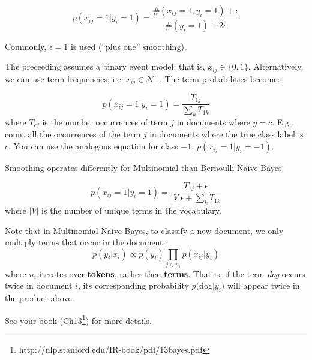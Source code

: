 \documentclass{article}
\begin{document}
$$
p(x_{ij}=1 | y_i = 1) = \frac{\#(x_{ij}=1, y_i=1) + \epsilon}{\# (y_i=1) + 2 \epsilon }
$$

Commonly, $\epsilon=1$ is used (``plus one'' smoothing).

\vspace{.1in}


The preceeding assumes a binary event model; that is, $x_{ij} \in \{0,1\}$. Alternatively, we can use term frequencies; i.e. $x_{ij} \in \mathcal{N}_+$. The term probabilities become:

$$
p(x_{ij}=1 | y_i = 1) = \frac{T_{1j}}{\sum_k T_{1k}}
$$
where $T_{cj}$ is the number occurrences of term $j$ in documents where $y=c$. E.g., count all the occurrences of the term $j$ in documents where the true class label is $c$. You can use the analogous equation for class $-1$, $p(x_{ij}=1 | y_i=-1)$.

Smoothing operates differently for Multinomial than Bernoulli Naive Bayes:

$$
p(x_{ij}=1 | y_i = 1) = \frac{T_{1j} + \epsilon}{|V|\epsilon + \sum_k T_{1k}}
$$
where $|V|$ is the number of unique terms in the vocabulary.

Note that in Multinomial Naive Bayes, to classify a new document, we only
multiply terms that occur in the document:
$$p(y_i|x_i) \propto p(y_i) \prod_{j \in n_i} p(x_{ij}|y_i)$$
where $n_i$ iterates over {\bf tokens}, rather then {\bf terms}. That is, if the term {\it dog} occurs twice in document $i$, its corresponding probability $p($dog$|y_i)$ will appear twice in the product above.

 See your book (Ch13\footnote{http://nlp.stanford.edu/IR-book/pdf/13bayes.pdf}) for more details.
\end{document}
